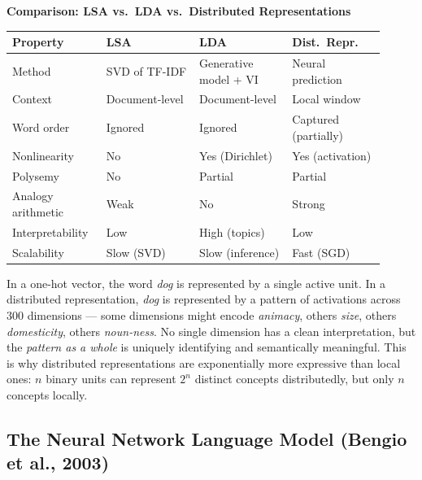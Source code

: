 \documentclass[11pt,a4paper]{article}
\begin{document}
\begin{tcolorbox}[colback=LightBlue,colframe=AccentBlue,boxrule=0.8pt,arc=3pt]
\textbf{Comparison: LSA vs.\ LDA vs.\ Distributed Representations}\\[6pt]
\renewcommand{\arraystretch}{1.3}
\begin{tabular}{@{}p{0.22\linewidth}p{0.23\linewidth}p{0.23\linewidth}p{0.23\linewidth}@{}}
\toprule
\textbf{Property} & \textbf{LSA} & \textbf{LDA} & \textbf{Dist.\ Repr.} \\
\midrule
Method & SVD of TF-IDF & Generative model + VI & Neural prediction \\
Context & Document-level & Document-level & Local window \\
Word order & Ignored & Ignored & Captured (partially) \\
Nonlinearity & No & Yes (Dirichlet) & Yes (activation) \\
Polysemy & No & Partial & Partial \\
Analogy arithmetic & Weak & No & Strong \\
Interpretability & Low & High (topics) & Low \\
Scalability & Slow (SVD) & Slow (inference) & Fast (SGD) \\
\bottomrule
\end{tabular}
\end{tcolorbox}

\begin{insightbox}
In a one-hot vector, the word \textit{dog} is represented by a single active unit.  In a distributed representation, \textit{dog} is represented by a pattern of activations across 300 dimensions — some dimensions might encode \textit{animacy}, others \textit{size}, others \textit{domesticity}, others \textit{noun-ness}.  No single dimension has a clean interpretation, but the \emph{pattern as a whole} is uniquely identifying and semantically meaningful.  This is why distributed representations are exponentially more expressive than local ones: $n$ binary units can represent $2^n$ distinct concepts distributedly, but only $n$ concepts locally.
\end{insightbox}


\subsection{The Neural Network Language Model (Bengio et al., 2003)}
\label{sec:nnlm}
\end{document}
